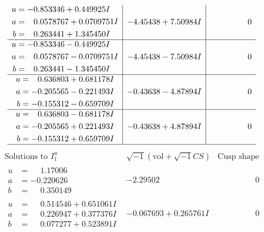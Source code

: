 \documentclass[1p]{elsarticle_modified}
\theoremstyle{definition}
\newcommand{\I}{\sqrt{-1}}
\begin{document}
$$\begin{array}{c|c|c}
\begin{aligned}
u &= -0.853346 + 0.449925 I \\
a &= \phantom{-}0.0578767 + 0.0709751 I \\
b &= \phantom{-}0.263441 + 1.345450 I\end{aligned}
 & -4.45438 + 7.50984 I & \phantom{-0.000000 } 0 \\ \hline\begin{aligned}
u &= -0.853346 - 0.449925 I \\
a &= \phantom{-}0.0578767 - 0.0709751 I \\
b &= \phantom{-}0.263441 - 1.345450 I\end{aligned}
 & -4.45438 - 7.50984 I & \phantom{-0.000000 } 0 \\ \hline\begin{aligned}
u &= \phantom{-}0.636803 + 0.681178 I \\
a &= -0.205565 - 0.221493 I \\
b &= -0.155312 - 0.659709 I\end{aligned}
 & -0.43638 - 4.87894 I & \phantom{-0.000000 } 0 \\ \hline\begin{aligned}
u &= \phantom{-}0.636803 - 0.681178 I \\
a &= -0.205565 + 0.221493 I \\
b &= -0.155312 + 0.659709 I\end{aligned}
 & -0.43638 + 4.87894 I & \phantom{-0.000000 } 0\\
 \hline 
 \end{array}$$\newpage$$\begin{array}{c|c|c}  
\text{Solutions to }I^u_{1}& \I (\text{vol} + \sqrt{-1}CS) & \text{Cusp shape}\\
 \hline 
\begin{aligned}
u &= \phantom{-}1.17006\phantom{ +0.000000I} \\
a &= -0.220626\phantom{ +0.000000I} \\
b &= \phantom{-}0.350149\phantom{ +0.000000I}\end{aligned}
 & -2.29502\phantom{ +0.000000I} & \phantom{-0.000000 } 0 \\ \hline\begin{aligned}
u &= \phantom{-}0.514546 + 0.651061 I \\
a &= \phantom{-}0.226947 + 0.377376 I \\
b &= \phantom{-}0.077277 + 0.523891 I\end{aligned}
 & -0.067693 + 0.265761 I & \phantom{-0.000000 } 0 \\ \hline\begin{aligned}

\end{aligned}
\end{array}$$
\end{document}
